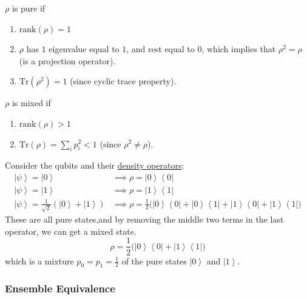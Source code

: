\documentclass{article}
\newcommand{\ket}[1]{\ensuremath{\left|#1\right\rangle}}
\newcommand{\bra}[1]{\ensuremath{\left\langle#1\right|}}
\newcounter{theorem}[section]
\newcounter{example}[section]
\begin{document}
    \begin{theorem}
      \label{thm:mixed-vs-pure-states}
      $\rho$ is pure if 
      \begin{enumerate} 
        \item $\mathrm{rank}(\rho) = 1$ 
        \item $\rho$ has $1$ eigenvalue equal to $1$, and rest equal to $0$, which implies that $\rho^2 = \rho$ (is a projection operator).
        \item $\mathrm{Tr}(\rho^2) = 1$ (since cyclic trace property). 
      \end{enumerate}

      $\rho$ is mixed if 
      \begin{enumerate} 
        \item $\mathrm{rank}(\rho) > 1$
        \item $\mathrm{Tr}(\rho) = \sum_i p_i^2 < 1$ (since $\rho^2 \neq \rho$).
      \end{enumerate}
    \end{theorem}

    \begin{example}
      \label{ex:simple-mixed-state}
      Consider the qubits and their \hyperref[def:density-operator]{density operators}: 
      \begin{align} 
        \ket{\psi} = \ket{0} & \implies \rho = \ket{0} \bra{0} \\
        \ket{\psi} = \ket{1} & \implies \rho = \ket{1} \bra{1} \\
        \ket{\psi} = \frac{1}{\sqrt{2}} ( \ket{0} + \ket{1}) & \implies \rho = \frac{1}{2} \big( \ket{0} \bra{0} + \ket{0} \bra{1} + \ket{1} \bra{0} + \ket{1} \bra{1} \big) 
      \end{align}
      These are all pure states,and by removing the middle two terms in the last operator, we can get a mixed state. 
      \begin{equation} 
        \rho = \frac{1}{2} \big( \ket{0} \bra{0} + \ket{1} \bra{1} \big) 
      \end{equation}
      which is a mixture $p_0 = p_1 = \frac{1}{2}$ of the pure states $\ket{0}$ and $\ket{1}$. 
    \end{example}

    \subsubsection{Ensemble Equivalence}
\end{document}

